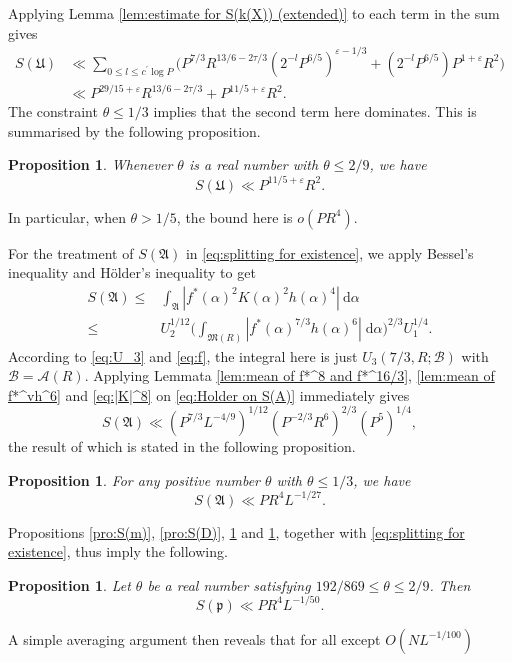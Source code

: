 \documentclass[12pt,english,reqno]{amsart}
\theoremstyle{definition}
\theoremstyle{remark}
\numberwithin{equation}{section}
\numberwithin{equation}{section}
\numberwithin{figure}{section}
\theoremstyle{plain}
\theoremstyle{plain}
\newtheorem{prop}[thm]{Proposition}
\theoremstyle{plain}
\theoremstyle{plain}
\numberwithin{equation}{section}
\numberwithin{thm}{section}
\begin{document}
Applying Lemma \ref{lem:estimate for S(k(X)) (extended)} to each
term in the sum gives
\begin{align}
S(\mathfrak{U})&\ll \sum_{0\leq l\leq c^{'}\log P}\Big(P^{7/3}R^{13/6-2\tau/3}(2^{-l}P^{6/5})^{\varepsilon-1/3}+(2^{-l}P^{6/5})P^{1+\varepsilon}R^2\Big)\\ &\ll P^{29/15+\varepsilon}R^{13/6-2\tau/3}+P^{11/5+\varepsilon}R^2.\end{align}
The constraint $\theta\leq1/3$ implies that the second term here dominates. This is summarised by the following proposition.
\begin{prop}
\label{pro:S(U)}Whenever $\theta$ is a real number with $\theta\leq2/9$,
we have
\[
S(\mathfrak{U})\ll P^{11/5+\varepsilon}R^2.\]
\end{prop}
In particular, when $\theta>1/5$, the bound here is $o(PR^4)$.
\par For the treatment of $S(\mathfrak{A})$ in \eqref{eq:splitting for existence},
we apply Bessel's inequality and H\"{o}lder's inequality to get
\begin{align}
S(\mathfrak{A})\leq & \int_{\mathfrak{A}}|f^{*}(\alpha)^{2}K(\alpha)^{2}h(\alpha)^{4}|\:\mathrm{d}\alpha\nonumber \\
\leq & U_2^{1/12}\Big(\int_{\mathfrak{M}(R)}|f^*(\alpha)^{7/3}h(\alpha)^6|\;\mathrm{d}\alpha\Big)^{2/3}U_1^{1/4}.\label{eq:Holder on S(A)}\end{align}
According to \eqref{eq:U_3} and \eqref{eq:f}, the integral here is just $U_3(7/3,R;\mathcal{B})$ with $\mathcal{B}=\mathcal{A}(R)$. Applying Lemmata \ref{lem:mean of f*^8 and f*^16/3}, \ref{lem:mean of f*^vh^6}
and \eqref{eq:|K|^8} on \eqref{eq:Holder on S(A)} immediately
gives
\[
S(\mathfrak{A})\ll(P^{7/3}L^{-4/9})^{1/12}(P^{-2/3}R^{6})^{2/3}(P^{5})^{1/4},\]
the result of which is stated in the following proposition.
\begin{prop}
\label{pro:S(A)}For any positive number $\theta$ with $\theta\leq1/3$,
we have
\[
S(\mathfrak{A})\ll PR^4L^{-1/27}.\]
\end{prop}
Propositions \ref{pro:S(m)}, \ref{pro:S(D)}, \ref{pro:S(U)} and
\ref{pro:S(A)}, together with \eqref{eq:splitting for existence},
thus imply the following.
\begin{prop}
Let $\theta$ be a real number satisfying $192/869\leq\theta\leq2/9$.
Then
\[
S(\mathfrak{p})\ll PR^4L^{-1/50}.\]
\end{prop}
\par A simple averaging argument then reveals that for all except $O(NL^{-1/100})$
\end{document}
